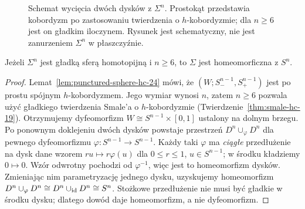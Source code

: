 \begin{figure}[htbp]
\centering
{}
\caption{Schemat wycięcia dwóch dysków z $\Sigma^n$.
Prostokąt przedstawia kobordyzm po zastosowaniu
twierdzenia o $h$-kobordyzmie; dla $n\geq6$
jest on gładkim iloczynem. Rysunek jest
schematyczny, nie jest zanurzeniem $\Sigma^n$
w płaszczyźnie.}
\label{fig:poincare-two-disks-24}
\end{figure}

\begin{twierdzenie}
\label{thm:poincare-high-24}
Jeżeli $\Sigma^n$ jest gładką sferą
homotopijną i $n\geq6$, to
$\Sigma$ jest homeomorficzna z $S^n$.
\end{twierdzenie}
\begin{proof}
Lemat~\ref{lem:punctured-sphere-hc-24}
mówi, że $(W;S_-^{n-1},S_+^{n-1})$
jest po prostu spójnym $h$-kobordyzmem.
Jego wymiar wynosi $n$, zatem $n\geq6$
pozwala użyć gładkiego twierdzenia
Smale'a o $h$-kobordyzmie
(Twierdzenie~\ref{thm:smale-hc-19}).
Otrzymujemy dyfeomorfizm
$W\cong S^{n-1}\times[0,1]$
ustalony na dolnym brzegu.
Po ponownym doklejeniu dwóch dysków
powstaje przestrzeń
$D^n\cup_{\varphi}D^n$
dla pewnego dyfeomorfizmu
$\varphi:S^{n-1}\to S^{n-1}$.
Każdy taki $\varphi$ ma \emph{ciągłe}
przedłużenie na dysk dane wzorem
$r u\mapsto r\varphi(u)$ dla
$0\leq r\leq1$, $u\in S^{n-1}$;
w środku kładziemy $0\mapsto0$.
Wzór odwrotny pochodzi od
$\varphi^{-1}$, więc jest to
homeomorfizm dysków. Zmieniając
nim parametryzację jednego dysku,
uzyskujemy homeomorfizm
$D^n\cup_\varphi D^n\cong
D^n\cup_{\mathrm{id}}D^n\cong S^n$.
Stożkowe przedłużenie nie musi
być gładkie w środku dysku;
dlatego dowód daje homeomorfizm,
a nie dyfeomorfizm.
\end{proof}

